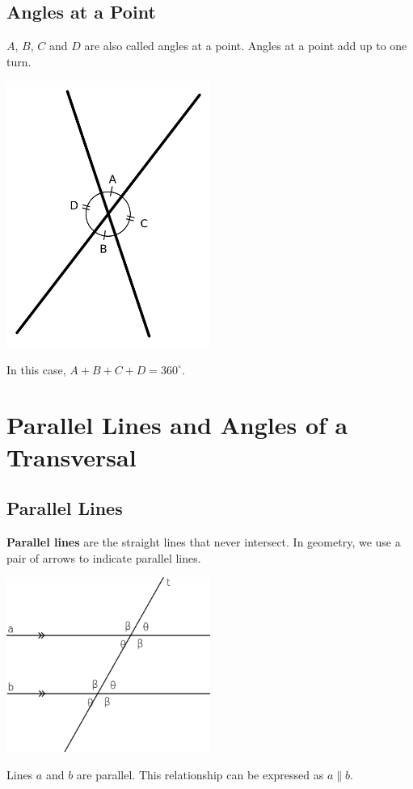 \documentclass[12pt,a4paper]{article}
\begin{document}
\subsection{Angles at a Point}
\(A\), \(B\), \(C\) and \(D\) are also called angles at a point. 
Angles at a point add up to one turn.
\begin{center}
\includegraphics[width=0.5\textwidth]{Vertical_Angles.png}
\end{center}
In this case, \(A+B+C+D=360^\circ\).

\newpage
\section{Parallel Lines and Angles of a Transversal}
\subsection{Parallel Lines}
{\bf Parallel lines} are the straight lines that never intersect.
In geometry, we use a pair of arrows to indicate parallel lines.
\begin{center}
\includegraphics[width=0.5\textwidth]{pl.png}
\end{center}
Lines \(a\) and \(b\) are parallel.
This relationship can be expressed as \(a\parallel b\).
\newpage
\end{document}
